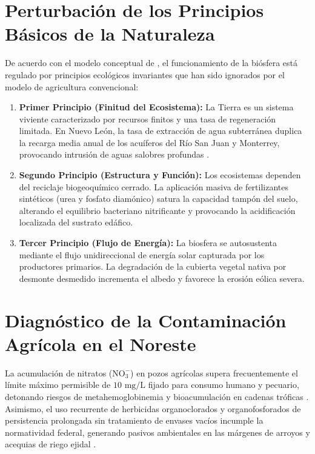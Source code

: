 \documentclass[spanish,letterpaper,oneside]{article}
\begin{document}
\section{Perturbación de los Principios Básicos de la Naturaleza}
De acuerdo con el modelo conceptual de \textcite{alfaro2014}, el funcionamiento de la biósfera está regulado por principios ecológicos invariantes que han sido ignorados por el modelo de agricultura convencional:
\begin{enumerate}
    \item \textbf{Primer Principio (Finitud del Ecosistema):} La Tierra es un sistema viviente caracterizado por recursos finitos y una tasa de regeneración limitada. En Nuevo León, la tasa de extracción de agua subterránea duplica la recarga media anual de los acuíferos del Río San Juan y Monterrey, provocando intrusión de aguas salobres profundas \parencite{conagua2023}.
    \item \textbf{Segundo Principio (Estructura y Función):} Los ecosistemas dependen del reciclaje biogeoquímico cerrado. La aplicación masiva de fertilizantes sintéticos (urea y fosfato diamónico) satura la capacidad tampón del suelo, alterando el equilibrio bacteriano nitrificante y provocando la acidificación localizada del sustrato edáfico.
    \item \textbf{Tercer Principio (Flujo de Energía):} La biosfera se autosustenta mediante el flujo unidireccional de energía solar capturada por los productores primarios. La degradación de la cubierta vegetal nativa por desmonte desmedido incrementa el albedo y favorece la erosión eólica severa.
\end{enumerate}

\section{Diagnóstico de la Contaminación Agrícola en el Noreste}
La acumulación de nitratos ($\mathrm{NO}_3^-$) en pozos agrícolas supera frecuentemente el límite máximo permisible de $10\text{ mg/L}$ fijado para consumo humano y pecuario, detonando riesgos de metahemoglobinemia y bioacumulación en cadenas tróficas \parencite{cantu2016}. Asimismo, el uso recurrente de herbicidas organoclorados y organofosforados de persistencia prolongada sin tratamiento de envases vacíos incumple la normatividad federal, generando pasivos ambientales en las márgenes de arroyos y acequias de riego ejidal \parencite{semarnat2020}.
\end{document}
